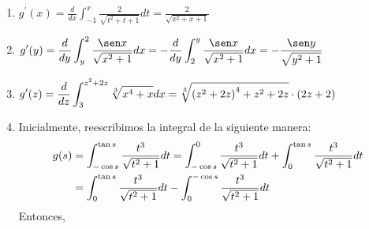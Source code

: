 \begin{enumerate}[leftmargin=1.2em,   itemindent=0pt,       labelwidth=\labelwidth,labelsep=0.5em,]
	
\item $\displaystyle{g^{\prime}(x)=\frac{d}{dx}\int_{-1}^{x}\frac{2}{\sqrt{t^{2}+t+1}}dt
 =\frac{2}{\sqrt{x^{2}+x+1}}}$

\item $\displaystyle{g^\prime(y)
 =\frac{d}{dy}\int_{y}^{2}\frac{\sen x}{\sqrt{x^{2}+1}}dx
 =-\frac{d}{dy}\int_{2}^{y}\frac{\sen x}{\sqrt{x^{2}+1}}dx}
 =-\frac{\sen y}{\sqrt{y^{2}+1}}$

\item $\displaystyle{g^{\prime}(z)=\frac{d}{dz}\int_{3}^{z^{2}+2z}\sqrt[3]{x^{4}+x}dx=\sqrt[3]{%
\left( z^{2}+2z\right) ^{4}+z^{2}+2z}\cdot \left( 2z+2\right)}$

\item Inicialmente, reescribimos la integral de la siguiente manera:
\begin{align*}
g(s)&=\int_{-\cos s}^{\tan s}\frac{t^{3}}{\sqrt{t^{2}+1}}dt=\int_{-\cos
s}^{0}\frac{t^{3}}{\sqrt{t^{2}+1}}dt+\int_{0}^{\tan s}\frac{t^{3}}{\sqrt{%
t^{2}+1}}dt\\
&=\int_{0}^{\tan s}\frac{t^{3}}{\sqrt{t^{2}+1}}
dt-\int_{0}^{-\cos s}\frac{t^{3}}{\sqrt{t^{2}+1}}dt
\end{align*}
Entonces,

\end{enumerate}

